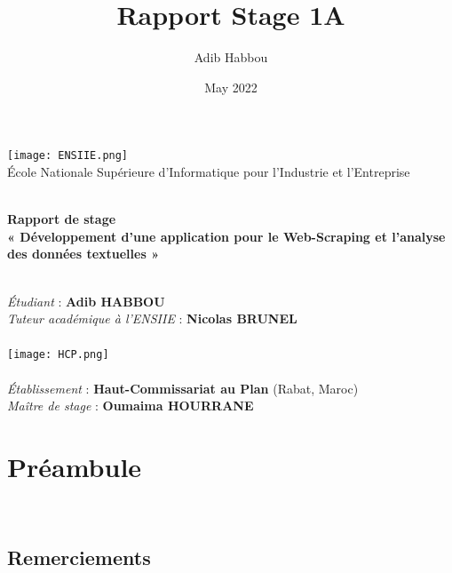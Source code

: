 \documentclass[a4paper,french,12pt]{article}
\title{Rapport Stage 1A}
\author{Adib Habbou}
\date{May 2022}
\begin{document}
\begin{titlepage}
\begin{center}

\texttt{[image: ENSIIE.png]}~\\[1.2cm]

{\large École Nationale Supérieure d'Informatique pour l'Industrie et l'Entreprise\\[1.0cm]}

\HRule \\[0.5cm]

{\huge \bfseries Rapport de stage\\[0.6cm]}
{\Large \bfseries « Développement d'une application pour le Web-Scraping et l'analyse des données textuelles »\\[0.5cm] }

\HRule \\[1.0cm]

{\large
\emph{Étudiant} : \textbf{Adib HABBOU}\\[0.3cm]
\emph{Tuteur académique à l'ENSIIE} : \textbf{Nicolas BRUNEL}\\

\HRule \\[1.0cm]

\texttt{[image: HCP.png]}~\\[0.5cm]

\HRule \\[0.5cm]

\emph{Établissement} : \textbf{Haut-Commissariat au Plan} (Rabat, Maroc)\\[0.3cm]
\emph{Maître de stage} : \textbf{Oumaima HOURRANE}\\}

\vfill


\end{center}
\end{titlepage}

\section*{Préambule}

\\

\subsection*{Remerciements}
\end{document}
